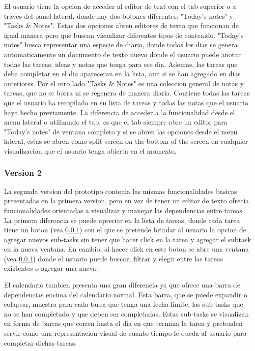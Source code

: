 El usuario tiene la opcion de acceder al editor de text con el tab superior o a traves del panel lateral, donde hay dos botones diferentes: "Today's notes" y "Tasks \& Notes". Estas dos opciones abren editores de texto que funcionan de igual manera pero que buscan visualizar diferentes tipos de contenido. "Today's notes" busca representar una especie de diario, donde todos los dias se genera automaticamente un documento de texto nuevo donde el usuario puede anotar todas las tareas, ideas y notas que tenga para ese dia. Ademas, las tareas que deba completar en el dia apareceran en la lista, aun si se han agregado en dias anteriores. Por el otro lado "Tasks \& Notes" es una coleccion general de notas y tareas, que no se borra ni se regenera de manera diaria. Contiene todas las tareas que el usuario ha recopilado en su lista de tareas y todas las notas que el usuario haya hecho previamente. La diferencia de acceder a la funcionalidad desde el menu lateral o utilizando el tab, es que el tab siempre abre un editor para "Today's notes" de ventana completo y si se abren las opciones desde el menu lateral, estas se abren como split screen on the bottom of the screen en cualquier visualizacion que el usuario tenga abierta en el momento. 

\subsubsection{Version 2}
La segunda version del prototipo contenia las mismas funcionalidades basicas presentadas en la primera version, pero en vez de tener un editor de texto ofrecia funcionalidades orientadas a visualizar y manejar las dependencias entre tareas. La primera diferencia se puede apreciar en la lista de tareas, donde cada tarea tiene un boton (vea \ref{}) con el que se pretende brindar al usuario la opcion de agregar nuevos sub-tasks sin tener que hacer click en la tarea y agregar el subtask en la nueva ventana. En cambio, al hacer click en este boton se abre una ventana (vea \ref{}) donde el usuario puede buscar, filtrar y elegir entre las tareas existentes o agregar una nueva. 

El calendario tambien presenta una gran diferencia ya que ofrece una barra de dependencias encima del calendario normal. Esta barra, que se puede expandir o colapsar, muestra para cada tarea que tenga una fecha limite, las sub-tasks que no se han completado y que deben ser completadas. Estas sub-tasks se visualizan en forma de barras que corren hasta el dia en que termina la tarea y pretenden servir como una representacion visual de cuanto tiempo le queda al usuario para completar dichas tareas. 

